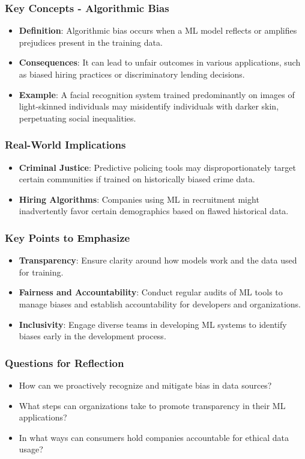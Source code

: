 \documentclass[aspectratio=169]{beamer}
\begin{document}
\begin{frame}[fragile]
    \frametitle{Key Concepts - Algorithmic Bias}
    \begin{itemize}
        \item \textbf{Definition}: Algorithmic bias occurs when a ML model reflects or amplifies prejudices present in the training data.
        \item \textbf{Consequences}: It can lead to unfair outcomes in various applications, such as biased hiring practices or discriminatory lending decisions.
        \item \textbf{Example}: A facial recognition system trained predominantly on images of light-skinned individuals may misidentify individuals with darker skin, perpetuating social inequalities.
    \end{itemize}
\end{frame}

\begin{frame}[fragile]
    \frametitle{Real-World Implications}
    \begin{itemize}
        \item \textbf{Criminal Justice}: Predictive policing tools may disproportionately target certain communities if trained on historically biased crime data.
        \item \textbf{Hiring Algorithms}: Companies using ML in recruitment might inadvertently favor certain demographics based on flawed historical data.
    \end{itemize}
\end{frame}

\begin{frame}[fragile]
    \frametitle{Key Points to Emphasize}
    \begin{itemize}
        \item \textbf{Transparency}: Ensure clarity around how models work and the data used for training.
        \item \textbf{Fairness and Accountability}: Conduct regular audits of ML tools to manage biases and establish accountability for developers and organizations.
        \item \textbf{Inclusivity}: Engage diverse teams in developing ML systems to identify biases early in the development process.
    \end{itemize}
\end{frame}

\begin{frame}[fragile]
    \frametitle{Questions for Reflection}
    \begin{itemize}
        \item How can we proactively recognize and mitigate bias in data sources?
        \item What steps can organizations take to promote transparency in their ML applications?
        \item In what ways can consumers hold companies accountable for ethical data usage?
    \end{itemize}
\end{frame}
\end{document}
